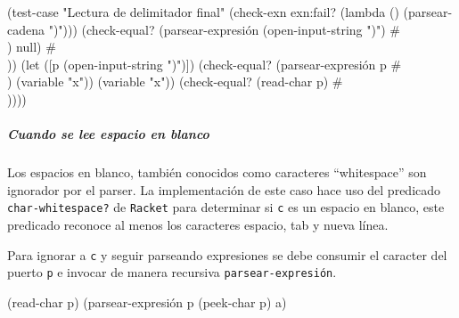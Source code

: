 \documentclass[10pt,oneside,openany,letterpaper]{book}
\begin{document}
\nwenddocs{}\plusendmoddef
(test-case "Lectura de delimitador final"
  (check-exn exn:fail? (lambda () (parsear-cadena ")")))
  (check-equal? (parsear-expresión (open-input-string ")") #\\) null) #\\))
  (let ([p (open-input-string ")")])
    (check-equal? (parsear-expresión p #\\) (variable "x")) (variable "x"))
    (check-equal? (read-char p) #\\))))
\nwendcode{}\nwdocspar


\subparagraph{Cuando se lee espacio en blanco} Los espacios en blanco, también conocidos como caracteres ``whitespace'' son ignorador por el parser. La implementación de este caso hace uso del predicado {\tt{}char-whitespace?} de {\tt{}Racket} para determinar si {\tt{}c} es un espacio en blanco, este predicado reconoce al menos los caracteres espacio, tab y nueva línea.

\nwenddocs{}
\nwendcode{}\nwdocspar

Para ignorar a {\tt{}c} y seguir parseando expresiones se debe consumir el caracter del puerto {\tt{}p} e invocar de manera recursiva {\tt{}\protect{}\protect{}parsear\protect{}-expresión}.

\nwenddocs{}\endmoddef
(read-char p)
(parsear-expresión p (peek-char p) a)
\nwendcode{}\nwdocspar
\end{document}
